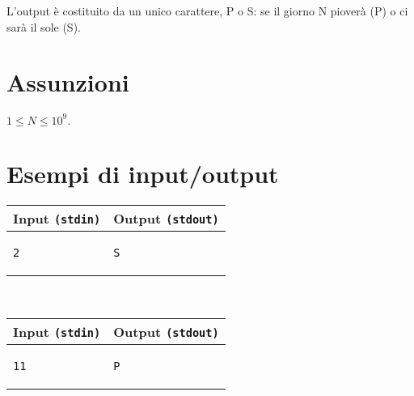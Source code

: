 \documentclass[a4paper,11pt]{article}
\begin{document}
L'output è costituito da un unico carattere, P o S: se il giorno N pioverà (P) o ci sarà il sole (S).
    
  \section*{Assunzioni}
$1 \leq N \leq 10^9.$

\section*{Esempi di input/output}

  
    \noindent
    \begin{tabular}{p{8cm}|p{8cm}}
    \toprule
    \textbf{Input \texttt{(stdin)}}
    & \textbf{Output \texttt{(stdout)}}
    \\
    \midrule
    \small
    \begin{verbatim}
2
      \end{verbatim}
    &
    \small
    \begin{verbatim}
S
\end{verbatim}
    \\
    \bottomrule
    \end{tabular}
    \\[12pt]
        \noindent
    \begin{tabular}{p{8cm}|p{8cm}}
    \toprule
    \textbf{Input \texttt{(stdin)}}
    & \textbf{Output \texttt{(stdout)}}
    \\
    \midrule
    \small
    \begin{verbatim}
11
      \end{verbatim}
    &
    \small
    \begin{verbatim}
P
\end{verbatim}
    \\
    \bottomrule
    \end{tabular}
  
\end{document}
